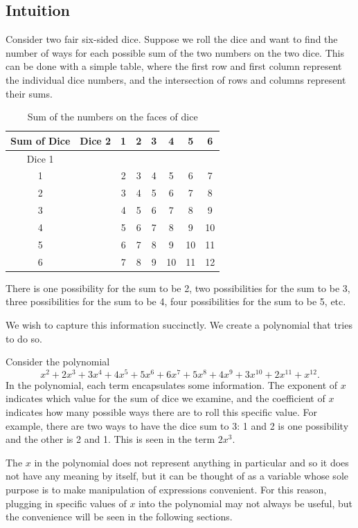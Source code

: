 \documentclass[12pt]{article}
\begin{document}
\subsection{Intuition}
Consider two fair six-sided dice. Suppose we roll the dice and want to find the number of ways for each possible sum of the two numbers on the two dice. This can be done with a simple table, where the first row and first column represent the individual dice numbers, and the intersection of rows and columns represent their sums. 
\begin{table}[H]
\centering
\begin{tabular}{|c|c|c|c|c|c|c|c|}
\hline
Sum of Dice & Dice 2 & 1 & 2 & 3 & 4  & 5  & 6  \\ \hline
Dice 1      &        &   &   &   &    &    &    \\ \hline
1           &        & 2 & 3 & 4 & 5  & 6  & 7  \\ \hline
2           &        & 3 & 4 & 5 & 6  & 7  & 8  \\ \hline
3           &        & 4 & 5 & 6 & 7  & 8  & 9  \\ \hline
4           &        & 5 & 6 & 7 & 8  & 9  & 10 \\ \hline
5           &        & 6 & 7 & 8 & 9  & 10 & 11 \\ \hline
6           &        & 7 & 8 & 9 & 10 & 11 & 12 \\ \hline
\end{tabular}
\caption{Sum of the numbers on the faces of dice}
\end{table}
There is one possibility for the sum to be 2, two possibilities for the sum to be 3, three possibilities for the sum to be 4, four possibilities for the sum to be 5, etc.

We wish to capture this information succinctly. We create a polynomial that tries to do so.

Consider the polynomial \[x^2 + 2x^3 + 3x^4 + 4x^5 + 5x^6 + 6x^7 + 5x^8 + 4x^9 + 3x^{10} + 2x^{11} + x^{12}.\] In the polynomial, each term encapsulates some information. The exponent of $x$ indicates which value for the sum of dice we examine, and the coefficient of $x$ indicates how many possible ways there are to roll this specific value. For example, there are two ways to have the dice sum to 3: 1 and 2 is one possibility and the other is 2 and 1. This is seen in the term $2x^3$.

The $x$ in the polynomial does not represent anything in particular and so it does not have any meaning by itself, but it can be thought of as a variable whose sole purpose is to make manipulation of expressions convenient. For this reason, plugging in specific values of $x$ into the polynomial may not always be useful, but the convenience will be seen in the following sections. 
\end{document}
